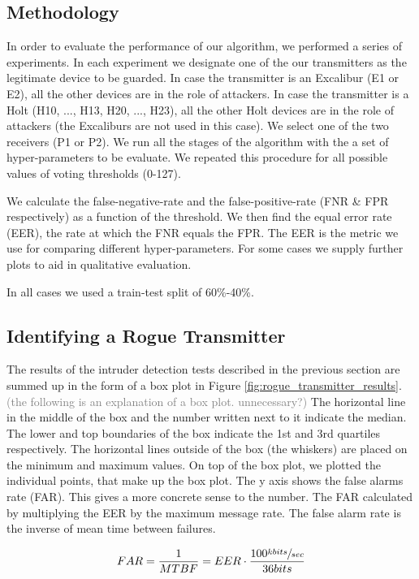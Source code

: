 \documentclass[conference]{IEEEtran}
\begin{document}
\subsection{Methodology}
  In order to evaluate the performance of our algorithm, we performed a series of experiments. In each experiment we designate one of the our transmitters as the legitimate device to be guarded. In case the transmitter is an Excalibur (E1 or E2), all the other devices are in the role of attackers. In case the transmitter is a Holt (H10, ..., H13, H20, ..., H23), all the other Holt devices are in the role of attackers (the Excaliburs are not used in this case). We select one of the two receivers (P1 or P2). We run all the stages of the algorithm with the a set of hyper-parameters to be evaluate. We repeated this procedure for all possible values of voting thresholds (0-127).
  
  We calculate the false-negative-rate and the false-positive-rate (FNR \& FPR respectively) as a function of the threshold. We then find the equal error rate (EER), the rate at which the FNR equals the FPR. The EER is the metric we use for comparing different hyper-parameters. For some cases we supply further plots to aid in qualitative evaluation.
  
  In all cases we used a train-test split of 60\%-40\%.
  
\subsection{Identifying a Rogue Transmitter}
  The results of the intruder detection tests described in the previous section are summed up in the form of a box plot in Figure \ref{fig:rogue_transmitter_results}. \textcolor{gray}{(the following is an explanation of a box plot. unnecessary?)} The horizontal line in the middle of the box and the number written next to it indicate the median. The lower and top boundaries of the box indicate the 1st and 3rd quartiles respectively. The horizontal lines outside of the box (the whiskers) are placed on the minimum and maximum values. On top of the box plot, we plotted the individual points, that make up the box plot.
  The y axis shows the false alarms rate (FAR). This gives a more concrete sense to the number. The FAR calculated by multiplying the EER by the maximum message rate. The false alarm rate is the inverse of mean time between failures.
  
  \[FAR = \frac{1}{MTBF} = EER \cdot \frac{100 \sfrac{kbits}{sec}}{36bits}\]
  
\end{document}
